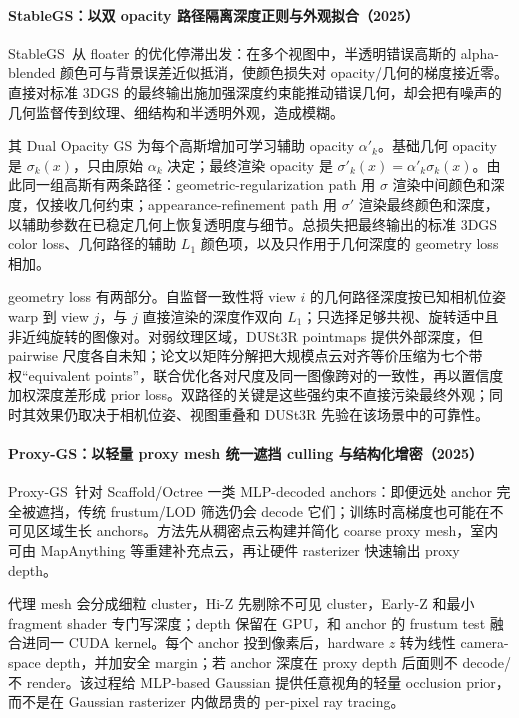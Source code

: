 \paragraph{StableGS：以双 opacity 路径隔离深度正则与外观拟合（2025）\cite{2503_18458}}
StableGS~\cite{2503_18458}从 floater 的优化停滞出发：在多个视图中，半透明错误高斯的 alpha-blended 颜色可与背景误差近似抵消，使颜色损失对 opacity/几何的梯度接近零。直接对标准 3DGS 的最终输出施加强深度约束能推动错误几何，却会把有噪声的几何监督传到纹理、细结构和半透明外观，造成模糊。

其 Dual Opacity GS 为每个高斯增加可学习辅助 opacity $\alpha'_k$。基础几何 opacity 是 $\sigma_k(x)$，只由原始 $\alpha_k$ 决定；最终渲染 opacity 是 $\sigma'_k(x)=\alpha'_k\sigma_k(x)$。由此同一组高斯有两条路径：geometric-regularization path 用 $\sigma$ 渲染中间颜色和深度，仅接收几何约束；appearance-refinement path 用 $\sigma'$ 渲染最终颜色和深度，以辅助参数在已稳定几何上恢复透明度与细节。总损失把最终输出的标准 3DGS color loss、几何路径的辅助 $L_1$ 颜色项，以及只作用于几何深度的 geometry loss 相加。

geometry loss 有两部分。自监督一致性将 view $i$ 的几何路径深度按已知相机位姿 warp 到 view $j$，与 $j$ 直接渲染的深度作双向 $L_1$；只选择足够共视、旋转适中且非近纯旋转的图像对。对弱纹理区域，DUSt3R pointmaps 提供外部深度，但 pairwise 尺度各自未知；论文以矩阵分解把大规模点云对齐等价压缩为七个带权“equivalent points”，联合优化各对尺度及同一图像跨对的一致性，再以置信度加权深度差形成 prior loss。双路径的关键是这些强约束不直接污染最终外观；同时其效果仍取决于相机位姿、视图重叠和 DUSt3R 先验在该场景中的可靠性。

\paragraph{Proxy-GS：以轻量 proxy mesh 统一遮挡 culling 与结构化增密（2025）\cite{2509_24421}}
Proxy-GS~\cite{2509_24421}针对 Scaffold/Octree 一类 MLP-decoded anchors：即便远处 anchor 完全被遮挡，传统 frustum/LOD 筛选仍会 decode 它们；训练时高梯度也可能在不可见区域生长 anchors。方法先从稠密点云构建并简化 coarse proxy mesh，室内可由 MapAnything 等重建补充点云，再让硬件 rasterizer 快速输出 proxy depth。

代理 mesh 会分成细粒 cluster，Hi-Z 先剔除不可见 cluster，Early-Z 和最小 fragment shader 专门写深度；depth 保留在 GPU，和 anchor 的 frustum test 融合进同一 CUDA kernel。每个 anchor 投到像素后，hardware $z$ 转为线性 camera-space depth，并加安全 margin；若 anchor 深度在 proxy depth 后面则不 decode/不 render。该过程给 MLP-based Gaussian 提供任意视角的轻量 occlusion prior，而不是在 Gaussian rasterizer 内做昂贵的 per-pixel ray tracing。

